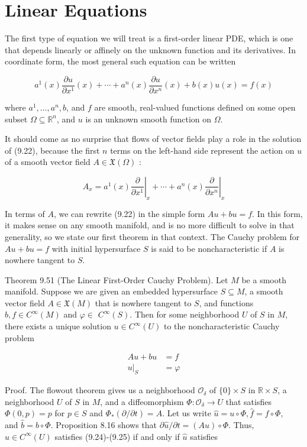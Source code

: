\documentclass[10pt]{article}
\begin{document}
\section*{Linear Equations}
The first type of equation we will treat is a first-order linear PDE, which is one that depends linearly or affinely on the unknown function and its derivatives. In coordinate form, the most general such equation can be written

$$
a^{1}(x) \frac{\partial u}{\partial x^{1}}(x)+\cdots+a^{n}(x) \frac{\partial u}{\partial x^{n}}(x)+b(x) u(x)=f(x)
$$

where $a^{1}, \ldots, a^{n}, b$, and $f$ are smooth, real-valued functions defined on some open subset $\Omega \subseteq \mathbb{R}^{n}$, and $u$ is an unknown smooth function on $\Omega$.

It should come as no surprise that flows of vector fields play a role in the solution of (9.22), because the first $n$ terms on the left-hand side represent the action on $u$ of a smooth vector field $A \in \mathfrak{X}(\Omega)$ :

$$
A_{x}=\left.a^{1}(x) \frac{\partial}{\partial x^{1}}\right|_{x}+\cdots+\left.a^{n}(x) \frac{\partial}{\partial x^{n}}\right|_{x}
$$

In terms of $A$, we can rewrite (9.22) in the simple form $A u+b u=f$. In this form, it makes sense on any smooth manifold, and is no more difficult to solve in that generality, so we state our first theorem in that context. The Cauchy problem for $A u+b u=f$ with initial hypersurface $S$ is said to be noncharacteristic if $A$ is nowhere tangent to $S$.

Theorem 9.51 (The Linear First-Order Cauchy Problem). Let $M$ be a smooth manifold. Suppose we are given an embedded hypersurface $S \subseteq M$, a smooth vector field $A \in \mathfrak{X}(M)$ that is nowhere tangent to $S$, and functions $b, f \in C^{\infty}(M)$ and $\varphi \in$ $C^{\infty}(S)$. Then for some neighborhood $U$ of $S$ in $M$, there exists a unique solution $u \in C^{\infty}(U)$ to the noncharacteristic Cauchy problem

$$
\begin{aligned}
A u+b u & =f \\
\left.u\right|_{S} & =\varphi
\end{aligned}
$$

Proof. The flowout theorem gives us a neighborhood $\mathcal{O}_{\delta}$ of $\{0\} \times S$ in $\mathbb{R} \times S$, a neighborhood $U$ of $S$ in $M$, and a diffeomorphism $\Phi: \mathcal{O}_{\delta} \rightarrow U$ that satisfies $\Phi(0, p)=p$ for $p \in S$ and $\Phi_{*}(\partial / \partial t)=A$. Let us write $\hat{u}=u \circ \Phi, \hat{f}=f \circ \Phi$,\\
and $\hat{b}=b \circ \Phi$. Proposition 8.16 shows that $\partial \hat{u} / \partial t=(A u) \circ \Phi$. Thus, $u \in C^{\infty}(U)$ satisfies (9.24)-(9.25) if and only if $\widehat{u}$ satisfies
\end{document}
